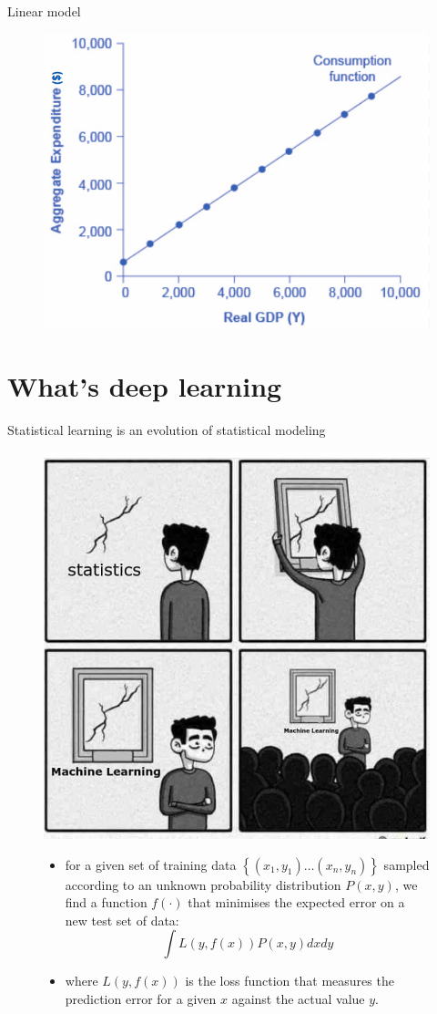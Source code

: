 \documentclass[12pt]{beamer}
\begin{document}
\begin{frame}{Linear model}
	\begin{figure}
		\centering
		\includegraphics[width=.75\linewidth]{income}
	\end{figure}
\end{frame}

\section{What's deep learning}

\begin{frame}{Statistical learning is an evolution of statistical modeling}
	\footnotesize
	\centering
	\begin{figure}
		\centering
		\includegraphics[width=.45\linewidth]{ML}

\begin{itemize}
				\tiny
		\item  for a given set of training data $\left\{\left(x_{1}, y_{1}\right) \ldots\left(x_{n}, y_{n}\right)\right\}$ sampled according to an unknown probability distribution $P(x, y)$, we find a function $f(\cdot)$ that minimises the expected error on a new test set of data:
			$$
			\int L(y, f(x)) P(x, y) d x d y
			$$
		\item	where $L(y, f(x))$ is the loss function that measures the prediction error for a given $x$ against the actual value $y$.			 
\end{itemize}
\end{figure}
\end{frame}
\end{document}
